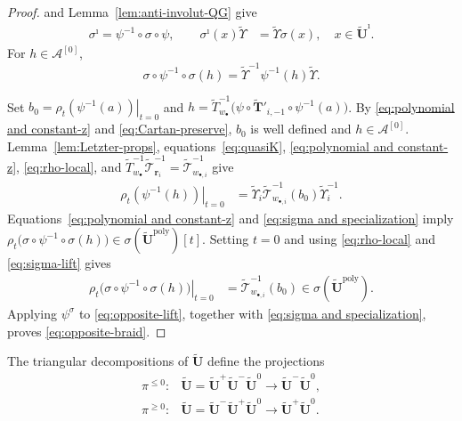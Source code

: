 \documentclass[a4paper,reqno,12pt]{amsart}
\numberwithin{equation}{section}
\theoremstyle{definition}
\theoremstyle{plain}
\theoremstyle{definition}
\def\bw{w_\bullet}
\def\bwi{w_{\bullet,i}}
\def\br{\mathbf r}
\def\tU{\widetilde{\mathbf U}}
\def\tUi{\widetilde{\mathbf U}^{\imath}}
\def\tTD{\widetilde T}
\def\tT{\widetilde{\mathscr T}}
\def\tTT{\widetilde{\mathbf T}}
\def\tfX{\widetilde\Upsilon}
\def\cA{\mathcal A}
\newcommand{\tTa}[1]{\tTT'_{#1,-1}}
\newcommand{\poly}{\mathrm{poly}}
\begin{document}
\begin{proof}
\cite[Corollary 4.7]{KY26} and Lemma~\ref{lem:anti-involut-QG} give
\begin{align*}
  \sigma^\imath=\psi^{-1}\circ\sigma\circ\psi,\qquad \sigma^\imath(x)\tfX&=\tfX\sigma(x), \quad x\in\tUi. 
\end{align*}
For $h\in\cA^{[0]}$,
\begin{equation}
  \sigma\circ\psi^{-1}\circ\sigma(h)=\tfX^{-1}\psi^{-1}(h)\tfX.\label{eq:sigma-lift}  
\end{equation}

Set $b_0=\left.\rho_t(\psi^{-1}(a))\right|_{t=0}$ and
$h=\tTD_{\bw}^{-1}\big(\psi\circ\tTa{i}\circ\psi^{-1}(a)\big)$. By \eqref{eq:polynomial and constant-z} and \eqref{eq:Cartan-preserve}, $b_0$ is well defined and $h\in\cA^{[0]}$.
Lemma~\ref{lem:Letzter-props}, equations~\eqref{eq:quasiK}, \eqref{eq:polynomial and constant-z}, \eqref{eq:rho-local}, and $\tTD_{\bw}^{-1}\tT_{\br_i}^{-1}=\tT_{\bwi}^{-1}$ give
\begin{align*}
\left.\rho_t(\psi^{-1}(h))\right|_{t=0}
&=\tfX_i\tT_{\bwi}^{-1}(b_0)\tfX_i^{-1}.
\end{align*}
Equations~\eqref{eq:polynomial and constant-z} and \eqref{eq:sigma and specialization} imply $\rho_t\bigl(\sigma\circ\psi^{-1}\circ\sigma(h)\bigr)\in\sigma(\tU^\poly)[t]$.
Setting $t=0$ and using \eqref{eq:rho-local} and \eqref{eq:sigma-lift} gives
\begin{align}
\left.\rho_t\bigl(\sigma\circ\psi^{-1}\circ\sigma(h)\bigr)\right|_{t=0}
&=\tT_{\bwi}^{-1}(b_0)\in\sigma(\tU^\poly).
\label{eq:opposite-lift}
\end{align}
Applying $\psi^\sigma$ to \eqref{eq:opposite-lift}, together with \eqref{eq:sigma and specialization}, proves \eqref{eq:opposite-braid}.
\end{proof}

The triangular decompositions of $\tU$ define the projections
\begin{align}
    \pi^{\le0}:&\tU=\tU^+\tU^-\tU^0\longrightarrow \tU^-\tU^0,\label{eq:proj-nega}\\
    \pi^{\ge0}:&\tU=\tU^-\tU^+\tU^0\longrightarrow \tU^+\tU^0.\label{eq:proj-posi}
\end{align}
\end{document}
